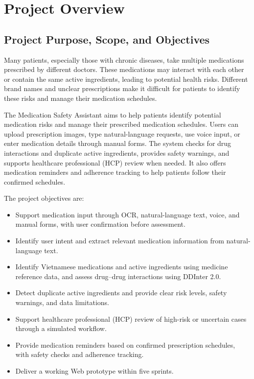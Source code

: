 \section{Project Overview}

\subsection{Project Purpose, Scope, and Objectives}

Many patients, especially those with chronic diseases, take
multiple medications prescribed by different doctors.
These medications may interact with each other or contain
the same active ingredients, leading to potential health
risks. Different brand names and unclear prescriptions
make it difficult for patients to identify these risks
and manage their medication schedules.

The Medication Safety Assistant aims to help patients
identify potential medication risks and manage their
prescribed medication schedules. 
Users can upload prescription images, type natural-language
requests, use voice input, or enter medication details
through manual forms.
The system checks for drug interactions and duplicate
active ingredients, provides safety warnings, and supports
healthcare professional (HCP) review when needed.
It also offers medication reminders and adherence tracking
to help patients follow their confirmed schedules.


The project objectives are:

\begin{itemize}
    \item Support medication input through OCR, natural-language
    text, voice, and manual forms, with user confirmation
    before assessment.

    \item Identify user intent and extract relevant medication
    information from natural-language text.

    \item Identify Vietnamese medications and active ingredients
    using medicine reference data, and assess drug--drug
    interactions using DDInter 2.0.

    \item Detect duplicate active ingredients and provide
    clear risk levels, safety warnings, and data limitations.

    \item Support healthcare professional (HCP) review of
    high-risk or uncertain cases through a simulated workflow.

    \item Provide medication reminders based on confirmed
    prescription schedules, with safety checks and
    adherence tracking.

    \item Deliver a working Web prototype within five sprints.
\end{itemize}

